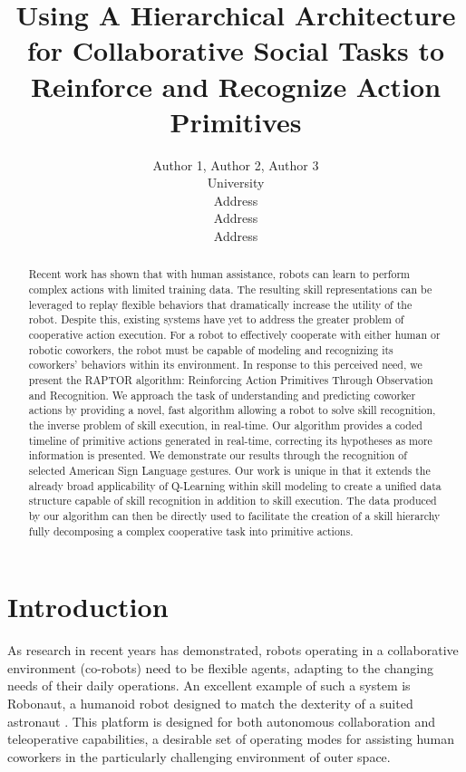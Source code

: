 \documentclass[letterpaper]{article}
\begin{document}
\title{Using A Hierarchical Architecture for Collaborative Social Tasks to Reinforce and Recognize Action Primitives}
\author{Author 1, Author 2, Author 3\\
University\\
Address\\
Address\\
Address\\
}

\maketitle

\begin{abstract}
 Recent work has shown that with human
assistance, robots can learn to perform complex actions with limited training data. The
resulting skill representations can be leveraged to replay flexible behaviors
that dramatically increase the utility of the robot. Despite this, existing
systems have yet to address the greater problem of cooperative action execution.
For a robot to effectively cooperate with either human or robotic coworkers,
the robot must be capable of modeling and recognizing its
coworkers' behaviors within its environment. In response to this perceived need, we present the RAPTOR algorithm: Reinforcing Action Primitives Through Observation and Recognition.
We approach the task of
understanding and predicting coworker actions by providing a novel, fast algorithm
allowing a robot to solve skill recognition, the inverse problem of skill execution,
in real-time. Our algorithm provides a coded timeline of
primitive actions generated in real-time, correcting its hypotheses as more
information is presented. We demonstrate our results through the recognition of selected
American Sign Language gestures. Our work is unique in that it extends the already broad applicability of
Q-Learning within skill modeling
to create a unified data structure capable of skill recognition in addition to skill execution.
The data produced by our algorithm can then be directly used to facilitate the
creation of a skill hierarchy fully decomposing a complex cooperative 
task into primitive actions.
\end{abstract}

\section{Introduction}
\label{sec:intro}
	As research in recent years has demonstrated, robots operating in a collaborative environment (co-robots) need to be flexible agents, adapting to the changing needs of their daily operations. An excellent example of such a system is Robonaut, a humanoid robot designed to match the dexterity of a suited astronaut \cite{Robonaut}. This platform is designed for both autonomous collaboration and teleoperative capabilities, a desirable set of operating modes for assisting human coworkers in the particularly challenging environment of outer space.
	
\end{document}
